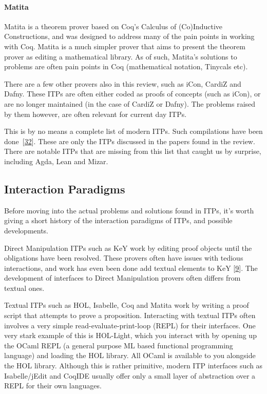 \documentclass[
]{article}
\begin{document}
\hypertarget{matita}{%
\paragraph{Matita}\label{matita}}

Matita is a theorem prover based on Coq's Calculus of (Co)Inductive
Constructions, and was designed to address many of the pain points in
working with Coq. Matita is a much simpler prover that aims to present
the theorem prover as editing a mathematical library. As of such,
Matita's solutions to problems are often pain points in Coq
(mathematical notation, Tinycals etc).

There are a few other provers also in this review, such as iCon, CardiZ
and Dafny. These ITPs are often either coded as proofs of concepts (such
as iCon), or are no longer maintained (in the case of CardiZ or Dafny).
The problems raised by them however, are often relevant for current day
ITPs.

This is by no means a complete list of modern ITPs. Such compilations
have been done~{[}\protect\hyperlink{ref-nawaz_survey_2019}{32}{]}.
These are only the ITPs discussed in the papers found in the review.
There are notable ITPs that are missing from this list that caught us by
surprise, including Agda, Lean and Mizar.

\hypertarget{interaction-paradigms}{%
\subsection{Interaction Paradigms}\label{interaction-paradigms}}

Before moving into the actual problems and solutions found in ITPs, it's
worth giving a short history of the interaction paradigms of ITPs, and
possible developments.

Direct Manipulation ITPs such as KeY work by editing proof objects until
the obligations have been resolved. These provers often have issues with
tedious interactions, and work has even been done add textual elements
to KeY {[}\protect\hyperlink{ref-beckert_interaction_2017}{9}{]}. The
development of interfaces to Direct Manipulation provers often differs
from textual ones.

Textual ITPs such as HOL, Isabelle, Coq and Matita work by writing a
proof script that attempts to prove a proposition. Interacting with
textual ITPs often involves a very simple read-evaluate-print-loop
(REPL) for their interfaces. One very stark example of this is
HOL-Light, which you interact with by opening up the OCaml REPL (a
general purpose ML based functional programming language) and loading
the HOL library. All OCaml is available to you alongside the HOL
library. Although this is rather primitive, modern ITP interfaces such
as Isabelle/jEdit and CoqIDE usually offer only a small layer of
abstraction over a REPL for their own languages.
\end{document}
